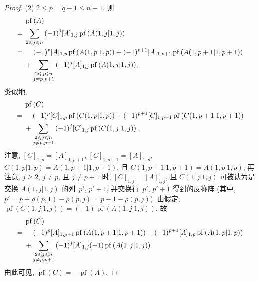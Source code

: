 \documentclass[../libro.tex]{subfiles}
\begin{document}
\begin{proof}
    (2)
    \(2 \leq p = q - 1 \leq n - 1\).
    则
    \begin{align*}
        &
        \operatorname{pf} {(A)}
        \\
        = {} &
        \sum_{2 \leq j \leq n}
        {
            (-1)^{j} [A]_{1,j}
            \operatorname{pf} {(A({1,j}|{1,j}))}
        }
        \\
        = {} &
        \hphantom{{} + {}}
        (-1)^{p} [A]_{1,p}
        \operatorname{pf} {(A({1,p}|{1,p}))}
        +
        (-1)^{p+1} [A]_{1,p+1}
        \operatorname{pf} {(A({1,p+1}|{1,p+1}))}
        \\
        &
        +
        \sum_{\substack{2 \leq j \leq n \\ j \neq p, p+1}}
        {
            (-1)^{j} [A]_{1,j}
            \operatorname{pf} {(A({1,j}|{1,j}))}
        }.
    \end{align*}
    类似地,
    \begin{align*}
        &
        \operatorname{pf} {(C)}
        \\
        = {} &
        \hphantom{{} + {}}
        (-1)^{p} [C]_{1,p}
        \operatorname{pf} {(C({1,p}|{1,p}))}
        +
        (-1)^{p+1} [C]_{1,p+1}
        \operatorname{pf} {(C({1,p+1}|{1,p+1}))}
        \\
        &
        +
        \sum_{\substack{2 \leq j \leq n \\ j \neq p, p+1}}
        {
            (-1)^{j} [C]_{1,j}
            \operatorname{pf} {(C({1,j}|{1,j}))}
        }.
    \end{align*}
    注意,
    \([C]_{1,p} = [A]_{1,p+1}\),
    \([C]_{1,p+1} = [A]_{1,p}\),
    \(C({1,p}|{1,p}) = A({1,p+1}|{1,p+1})\),
    且 \(C({1,p+1}|{1,p+1}) = A({1,p}|{1,p})\);
    再注意, \(j \geq 2\), \(j \neq p\), 且 \(j \neq p+1\) 时,
    \([C]_{1,j} = [A]_{1,j}\),
    且 \(C({1,j}|{1,j})\)
    可被认为是交换
    \(A({1,j}|{1,j})\) 的列~\(p'\), \(p'+1\),
    并交换行~\(p'\), \(p'+1\) 得到的反称阵
    (其中, \(p' = p - \rho(p, 1) - \rho(p, j)
    = p - 1 - \rho(p, j)\)).
    由假定,
    \(
        \operatorname{pf} {(C({1,j}|{1,j}))}
        = (-1) \operatorname{pf} {(A({1,j}|{1,j}))}
    \).
    故
    \begin{align*}
        &
        \operatorname{pf} {(C)}
        \\
        = {} &
        \hphantom{{} + {}}
        (-1)^{p} [A]_{1,p+1}
        \operatorname{pf} {(A({1,p+1}|{1,p+1}))}
        +
        (-1)^{p+1} [A]_{1,p}
        \operatorname{pf} {(A({1,p}|{1,p}))}
        \\
        &
        +
        \sum_{\substack{2 \leq j \leq n \\ j \neq p, p+1}}
        {
            (-1)^{j} [A]_{1,j}
            (-1) \operatorname{pf} {(A({1,j}|{1,j}))}
        }.
    \end{align*}
    由此可见, \(\operatorname{pf} {(C)}
    = -\operatorname{pf} {(A)}\).


\end{proof}
\end{document}
